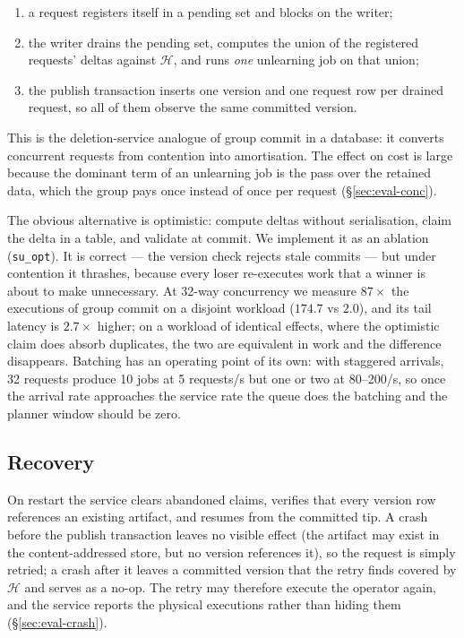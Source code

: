 \documentclass[conference]{IEEEtran}
\newcommand{\Hset}{\mathcal{H}}
\begin{document}
\begin{enumerate}
\item a request registers itself in a pending set and blocks on the writer;
\item the writer drains the pending set, computes the union of the registered
requests' deltas against $\Hset$, and runs \emph{one} unlearning job on that union;
\item the publish transaction inserts one version and one request row per drained
request, so all of them observe the same committed version.
\end{enumerate}

This is the deletion-service analogue of group commit in a database: it converts
concurrent requests from contention into amortisation.  The effect on cost is large
because the dominant term of an unlearning job is the pass over the retained data,
which the group pays once instead of once per request (\S\ref{sec:eval-conc}).

The obvious alternative is optimistic: compute deltas without serialisation, claim
the delta in a table, and validate at commit.  We implement it as an ablation
(\texttt{su\_opt}).  It is correct --- the version check rejects stale commits --- but
under contention it thrash\-es, because every loser re-executes work that a winner is
about to make unnecessary.  At 32-way concurrency we measure $87\times$ the
executions of group commit on a disjoint workload ($174.7$ vs $2.0$), and its tail
latency is $2.7\times$ higher; on a workload of identical effects, where the optimistic
claim does absorb duplicates, the two are equivalent in work and the difference
disappears.  Batching has an operating point of its own: with staggered arrivals, 32
requests produce 10 jobs at 5 requests/s but one or two at 80--200/s, so once the arrival
rate approaches the service rate the queue does the batching and the planner window should
be zero.

\subsection{Recovery}
\label{sec:recovery}

On restart the service clears abandoned claims, verifies that every version row
references an existing artifact, and resumes from the committed tip.  A crash before
the publish transaction leaves no visible effect (the artifact may exist in the
content-addressed store, but no version references it), so the request is simply
retried; a crash after it leaves a committed version that the retry finds covered by
$\Hset$ and serves as a no-op.  The retry may therefore execute the operator again, and
the service reports the physical executions rather than hiding them
(\S\ref{sec:eval-crash}).
\end{document}
